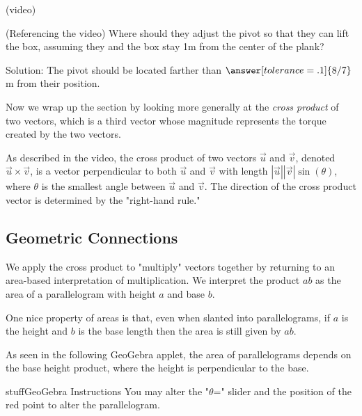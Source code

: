 \documentclass{ximera}
\begin{document}
(video)

\begin{problem}
    (Referencing the video) Where should they adjust the pivot so that they can lift the box, assuming they and the box stay 1m from the center of the plank?

    Solution: The pivot should be located farther than $\answer[tolerance=.1]{8/7}$ m from their position.
\end{problem}

Now we wrap up the section by looking more generally at the \emph{cross product} of two vectors, which is a third vector whose magnitude represents the torque created by the two vectors.

\begin{center}
\end{center}

\begin{definition}
    As described in the video, the cross product of two vectors $\vec{u}$ and $\vec{v}$, denoted $\vec{u}\times \vec{v}$, is a vector perpendicular to both $\vec{u}$ and $\vec{v}$ with length $|\vec{u}||\vec{v}|\sin(\theta)$, where $\theta$ is the smallest angle between $\vec{u}$ and $\vec{v}$. The direction of the cross product vector is determined by the "right-hand rule."
\end{definition}

\subsection*{Geometric Connections}
We apply the cross product to "multiply" vectors together by returning to an area-based interpretation of multiplication. We interpret the product $ab$ as the area of a parallelogram with height $a$ and base $b$. 

One nice property of areas is that, even when slanted into parallelograms, if $a$ is the height and $b$ is the base length then the area is still given by $ab$.

As seen in the following GeoGebra applet, the area of parallelograms depends on the base height product, where the height is perpendicular to the base. 

\begin{expandable}{stuff}{GeoGebra Instructions}
    You may alter the "$\theta$=" slider and the position of the red point to alter the parallelogram.
\end{expandable}

\begin{center}
\end{center}
\end{document}
